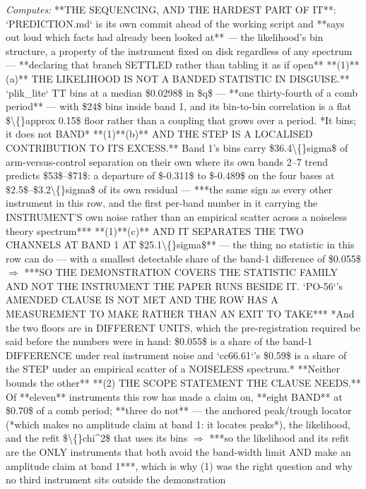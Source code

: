 \begin{description}
\emph{Computes:}  **THE SEQUENCING, AND THE HARDEST PART OF IT**: `PREDICTION.md` is its own commit ahead of the working script and **says out loud which facts had already been looked at** --- the likelihood's bin structure, a property of the instrument fixed on disk regardless of any spectrum --- **declaring that branch SETTLED rather than tabling it as if open**   **(1)**(a)** THE LIKELIHOOD IS NOT A BANDED STATISTIC IN DISGUISE.** `plik\_lite` TT bins at a median \$0.0298\$ in \$q\$ --- **one thirty-fourth of a comb period** --- with \$24\$ bins inside band 1, and its bin-to-bin correlation is a flat \$\textbackslash\{\}approx 0.15\$ floor rather than a coupling that grows over a period.  *It bins; it does not BAND*   **(1)**(b)** AND THE STEP IS A LOCALISED CONTRIBUTION TO ITS EXCESS.** Band 1's bins carry \$36.4\textbackslash\{\}sigma\$ of arm-versus-control separation on their own where its own bands 2--7 trend predicts \$53\$--\$71\$: a departure of \$-0.311\$ to \$-0.489\$ on the four bases at \$2.5\$--\$3.2\textbackslash\{\}sigma\$ of its own residual --- ***the same sign as every other instrument in this row, and the first per-band number in it carrying the INSTRUMENT'S own noise rather than an empirical scatter across a noiseless theory spectrum***   **(1)**(c)** AND IT SEPARATES THE TWO CHANNELS AT BAND 1 AT \$25.1\textbackslash\{\}sigma\$** --- the thing no statistic in this row can do --- with a smallest detectable share of the band-1 difference of \$0.055\$  \ensuremath{\Rightarrow} ***SO THE DEMONSTRATION COVERS THE STATISTIC FAMILY AND NOT THE INSTRUMENT THE PAPER RUNS BESIDE IT.  `PO-56`'s AMENDED CLAUSE IS NOT MET AND THE ROW HAS A MEASUREMENT TO MAKE RATHER THAN AN EXIT TO TAKE***   *And the two floors are in DIFFERENT UNITS, which the pre-registration required be said before the numbers were in hand: \$0.055\$ is a share of the band-1 DIFFERENCE under real instrument noise and `cc66.61`'s \$0.59\$ is a share of the STEP under an empirical scatter of a NOISELESS spectrum.* **Neither bounds the other**   **(2) THE SCOPE STATEMENT THE CLAUSE NEEDS.** Of **eleven** instruments this row has made a claim on, **eight BAND** at \$0.70\$ of a comb period; **three do not** --- the anchored peak/trough locator (*which makes no amplitude claim at band 1: it locates peaks*), the likelihood, and the refit \$\textbackslash\{\}chi\textasciicircum{}2\$ that uses its bins \ensuremath{\Rightarrow} ***so the likelihood and its refit are the ONLY instruments that both avoid the band-width limit AND make an amplitude claim at band 1***, which is why (1) was the right question and why no third instrument sits outside the demonstration

\end{description}
